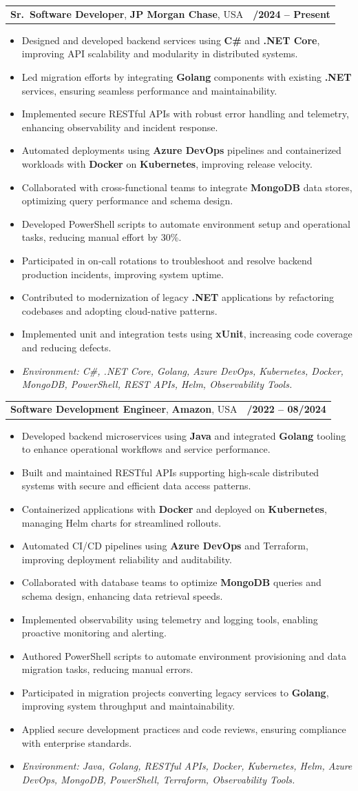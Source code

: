 \documentclass[letterpaper,11pt]{article}
\makeatletter
\newcommand{\resumeItem}[1]{
  \item\footnotesize{
    {#1 \vspace{-2pt}}
  }
}
\newcommand{\resumeSubheading}[4]{
  \vspace{-2pt}\item
    \begin{tabular*}{1.0\textwidth}[t]{l@{\extracolsep{\fill}}r}
      \textbf{\fontsize{10pt}{14pt}\selectfont #3}, \textbf{\fontsize{10pt}{14pt}\selectfont #1}, \fontsize{10pt}{14pt}\selectfont #4 & \textbf{\fontsize{10pt}{14pt}\selectfont #2} \\
    \end{tabular*}\vspace{-7pt}
}
\newcommand{\resumeItemListStart}{\begin{itemize}[leftmargin=*]}
\newcommand{\resumeItemListEnd}{\end{itemize}\vspace{-5pt}}
\makeatother
\begin{document}
\resumeSubheading
{JP Morgan Chase}{09/2024 -- Present}
{Sr.\ Software Developer}{USA}
\resumeItemListStart
  \resumeItem{Designed and developed backend services using \textbf{C\#} and \textbf{.NET Core}, improving API scalability and modularity in distributed systems.}
  \resumeItem{Led migration efforts by integrating \textbf{Golang} components with existing \textbf{.NET} services, ensuring seamless performance and maintainability.}
  \resumeItem{Implemented secure RESTful APIs with robust error handling and telemetry, enhancing observability and incident response.}
  \resumeItem{Automated deployments using \textbf{Azure DevOps} pipelines and containerized workloads with \textbf{Docker} on \textbf{Kubernetes}, improving release velocity.}
  \resumeItem{Collaborated with cross-functional teams to integrate \textbf{MongoDB} data stores, optimizing query performance and schema design.}
  \resumeItem{Developed PowerShell scripts to automate environment setup and operational tasks, reducing manual effort by 30\%.}
  \resumeItem{Participated in on-call rotations to troubleshoot and resolve backend production incidents, improving system uptime.}
  \resumeItem{Contributed to modernization of legacy \textbf{.NET} applications by refactoring codebases and adopting cloud-native patterns.}
  \resumeItem{Implemented unit and integration tests using \textbf{xUnit}, increasing code coverage and reducing defects.}
  \resumeItem{\textit{Environment: C\#, .NET Core, Golang, Azure DevOps, Kubernetes, Docker, MongoDB, PowerShell, REST APIs, Helm, Observability Tools.}}
\resumeItemListEnd

\resumeSubheading
{Amazon}{10/2022 -- 08/2024}
{Software Development Engineer}{USA}
\resumeItemListStart
  \resumeItem{Developed backend microservices using \textbf{Java} and integrated \textbf{Golang} tooling to enhance operational workflows and service performance.}
  \resumeItem{Built and maintained RESTful APIs supporting high-scale distributed systems with secure and efficient data access patterns.}
  \resumeItem{Containerized applications with \textbf{Docker} and deployed on \textbf{Kubernetes}, managing Helm charts for streamlined rollouts.}
  \resumeItem{Automated CI/CD pipelines using \textbf{Azure DevOps} and Terraform, improving deployment reliability and auditability.}
  \resumeItem{Collaborated with database teams to optimize \textbf{MongoDB} queries and schema design, enhancing data retrieval speeds.}
  \resumeItem{Implemented observability using telemetry and logging tools, enabling proactive monitoring and alerting.}
  \resumeItem{Authored PowerShell scripts to automate environment provisioning and data migration tasks, reducing manual errors.}
  \resumeItem{Participated in migration projects converting legacy services to \textbf{Golang}, improving system throughput and maintainability.}
  \resumeItem{Applied secure development practices and code reviews, ensuring compliance with enterprise standards.}
  \resumeItem{\textit{Environment: Java, Golang, RESTful APIs, Docker, Kubernetes, Helm, Azure DevOps, MongoDB, PowerShell, Terraform, Observability Tools.}}
\resumeItemListEnd
\end{document}

